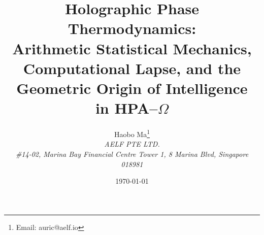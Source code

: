 \documentclass[11pt,a4paper]{article}
\title{Holographic Phase Thermodynamics: \\ Arithmetic Statistical Mechanics, Computational Lapse, and the Geometric Origin of Intelligence \\ in HPA--$\Omega$}
\author{Haobo Ma\thanks{Email: auric@aelf.io} \\
\textit{AELF PTE LTD.} \\
\textit{\#14-02, Marina Bay Financial Centre Tower 1, 8 Marina Blvd, Singapore 018981}}
\date{\today}
\begin{document}
\maketitle














\FloatBarrier
\appendix


\FloatBarrier

\end{document}
